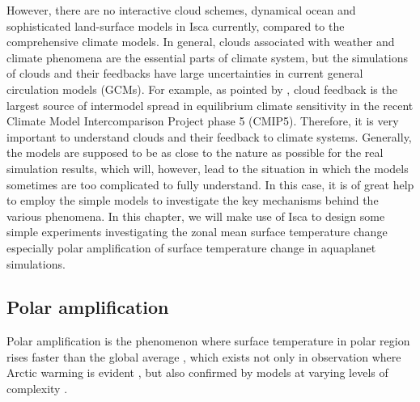 However, there are no interactive cloud schemes, dynamical ocean and sophisticated land-surface models in Isca currently, compared to the comprehensive climate models. In general, clouds associated with weather and climate phenomena are the essential parts of climate system, but the simulations of clouds and their feedbacks have large uncertainties in current general circulation models (GCMs). For example, as pointed by \cite{Ceppi2017}, cloud feedback is the largest source of intermodel spread in equilibrium climate sensitivity in the recent Climate Model Intercomparison Project phase 5 (CMIP5). Therefore, it is very important to understand clouds and their feedback to climate systems. Generally, the models are supposed to be as close to the nature as possible for the real simulation results, which will, however, lead to the situation in which the models sometimes are too complicated to fully understand. In this case, it is of great help to employ the simple models to investigate the key mechanisms behind the various phenomena. In this chapter, we will make use of Isca to design some simple experiments investigating the zonal mean surface temperature change especially polar amplification of surface temperature change in aquaplanet simulations.%


 
 
\subsection{Polar amplification}

Polar amplification is the phenomenon where surface temperature in polar region rises faster than the global average \citep{IPCC2007Synth}, which exists not only in observation where Arctic warming is evident \citep{Johannessen2004,Polyakov2002}, but also confirmed by models at varying levels of complexity \citep[e.g.,][]{Winton2006amplified,Langen2007,Merlis2018,Alexeev2005}.

